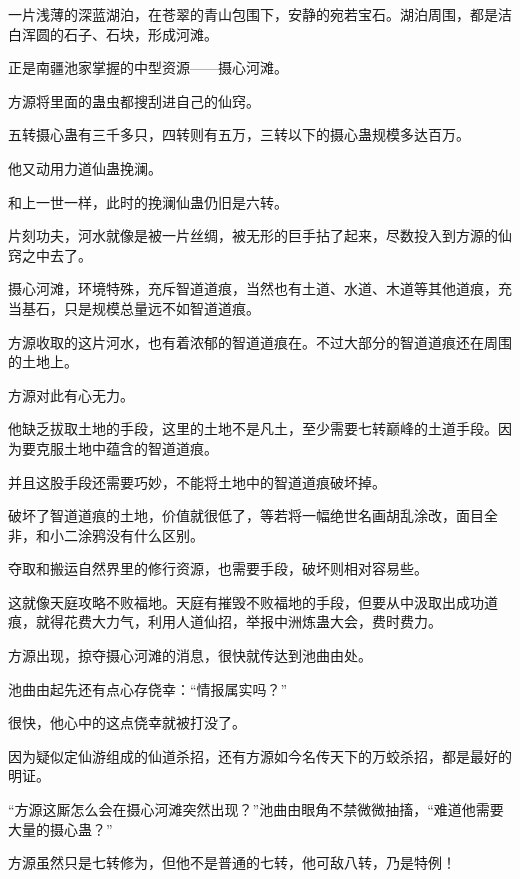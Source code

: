 
\begin{this_body}



一片浅薄的深蓝湖泊，在苍翠的青山包围下，安静的宛若宝石。湖泊周围，都是洁白浑圆的石子、石块，形成河滩。

正是南疆池家掌握的中型资源——摄心河滩。

方源将里面的蛊虫都搜刮进自己的仙窍。

五转摄心蛊有三千多只，四转则有五万，三转以下的摄心蛊规模多达百万。

他又动用力道仙蛊挽澜。

和上一世一样，此时的挽澜仙蛊仍旧是六转。

片刻功夫，河水就像是被一片丝绸，被无形的巨手拈了起来，尽数投入到方源的仙窍之中去了。

摄心河滩，环境特殊，充斥智道道痕，当然也有土道、水道、木道等其他道痕，充当基石，只是规模总量远不如智道道痕。

方源收取的这片河水，也有着浓郁的智道道痕在。不过大部分的智道道痕还在周围的土地上。

方源对此有心无力。

他缺乏拔取土地的手段，这里的土地不是凡土，至少需要七转巅峰的土道手段。因为要克服土地中蕴含的智道道痕。

并且这股手段还需要巧妙，不能将土地中的智道道痕破坏掉。

破坏了智道道痕的土地，价值就很低了，等若将一幅绝世名画胡乱涂改，面目全非，和小二涂鸦没有什么区别。

夺取和搬运自然界里的修行资源，也需要手段，破坏则相对容易些。

这就像天庭攻略不败福地。天庭有摧毁不败福地的手段，但要从中汲取出成功道痕，就得花费大力气，利用人道仙招，举报中洲炼蛊大会，费时费力。

方源出现，掠夺摄心河滩的消息，很快就传达到池曲由处。

池曲由起先还有点心存侥幸：“情报属实吗？”

很快，他心中的这点侥幸就被打没了。

因为疑似定仙游组成的仙道杀招，还有方源如今名传天下的万蛟杀招，都是最好的明证。

“方源这厮怎么会在摄心河滩突然出现？”池曲由眼角不禁微微抽搐，“难道他需要大量的摄心蛊？”

方源虽然只是七转修为，但他不是普通的七转，他可敌八转，乃是特例！


\end{this_body}

